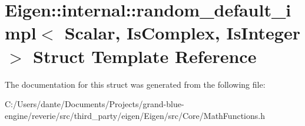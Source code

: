 \hypertarget{struct_eigen_1_1internal_1_1random__default__impl}{}\section{Eigen\+::internal\+::random\+\_\+default\+\_\+impl$<$ Scalar, Is\+Complex, Is\+Integer $>$ Struct Template Reference}
\label{struct_eigen_1_1internal_1_1random__default__impl}


The documentation for this struct was generated from the following file\+:\begin{DoxyCompactItemize}
\item 
C\+:/\+Users/dante/\+Documents/\+Projects/grand-\/blue-\/engine/reverie/src/third\+\_\+party/eigen/\+Eigen/src/\+Core/Math\+Functions.\+h\end{DoxyCompactItemize}

